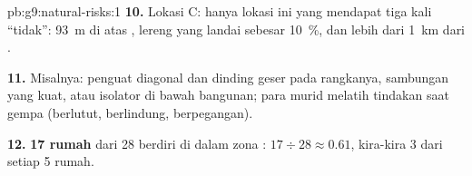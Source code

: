 \begin{solution}{pb:g9:natural-risks:1}
\textbf{10.} Lokasi C: hanya lokasi ini yang mendapat tiga kali
``tidak'': \qty{93}{m} di atas , lereng yang landai sebesar
\qty{10}{\%}, dan lebih dari \qty{1}{km} dari .

\textbf{11.} Misalnya: penguat diagonal dan dinding geser pada rangkanya,
sambungan yang kuat, atau isolator di bawah bangunan; para murid melatih
tindakan saat gempa (berlutut, berlindung, berpegangan).

\textbf{12.} \textbf{17 rumah} dari 28 berdiri di dalam zona :
$17 \div 28 \approx 0.61$, kira-kira 3 dari setiap 5 rumah.
\end{solution}
